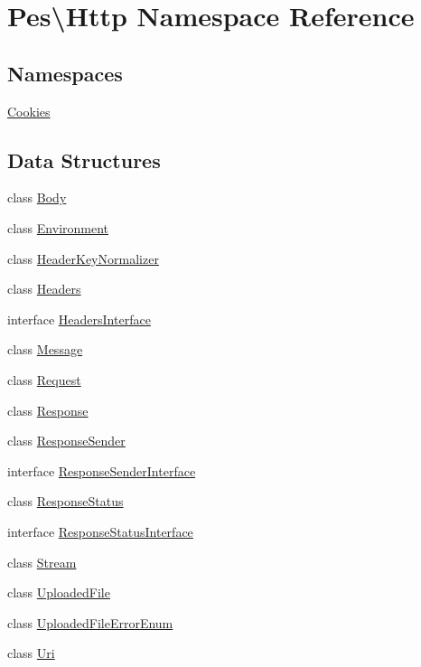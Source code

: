 \hypertarget{namespace_pes_1_1_http}{}\section{Pes\textbackslash{}Http Namespace Reference}
\label{namespace_pes_1_1_http}
\subsection*{Namespaces}
\begin{DoxyCompactItemize}
\item 
 \mbox{\hyperlink{namespace_pes_1_1_http_1_1_cookies}{Cookies}}
\end{DoxyCompactItemize}
\subsection*{Data Structures}
\begin{DoxyCompactItemize}
\item 
class \mbox{\hyperlink{class_pes_1_1_http_1_1_body}{Body}}
\item 
class \mbox{\hyperlink{class_pes_1_1_http_1_1_environment}{Environment}}
\item 
class \mbox{\hyperlink{class_pes_1_1_http_1_1_header_key_normalizer}{Header\+Key\+Normalizer}}
\item 
class \mbox{\hyperlink{class_pes_1_1_http_1_1_headers}{Headers}}
\item 
interface \mbox{\hyperlink{interface_pes_1_1_http_1_1_headers_interface}{Headers\+Interface}}
\item 
class \mbox{\hyperlink{class_pes_1_1_http_1_1_message}{Message}}
\item 
class \mbox{\hyperlink{class_pes_1_1_http_1_1_request}{Request}}
\item 
class \mbox{\hyperlink{class_pes_1_1_http_1_1_response}{Response}}
\item 
class \mbox{\hyperlink{class_pes_1_1_http_1_1_response_sender}{Response\+Sender}}
\item 
interface \mbox{\hyperlink{interface_pes_1_1_http_1_1_response_sender_interface}{Response\+Sender\+Interface}}
\item 
class \mbox{\hyperlink{class_pes_1_1_http_1_1_response_status}{Response\+Status}}
\item 
interface \mbox{\hyperlink{interface_pes_1_1_http_1_1_response_status_interface}{Response\+Status\+Interface}}
\item 
class \mbox{\hyperlink{class_pes_1_1_http_1_1_stream}{Stream}}
\item 
class \mbox{\hyperlink{class_pes_1_1_http_1_1_uploaded_file}{Uploaded\+File}}
\item 
class \mbox{\hyperlink{class_pes_1_1_http_1_1_uploaded_file_error_enum}{Uploaded\+File\+Error\+Enum}}
\item 
class \mbox{\hyperlink{class_pes_1_1_http_1_1_uri}{Uri}}
\end{DoxyCompactItemize}


